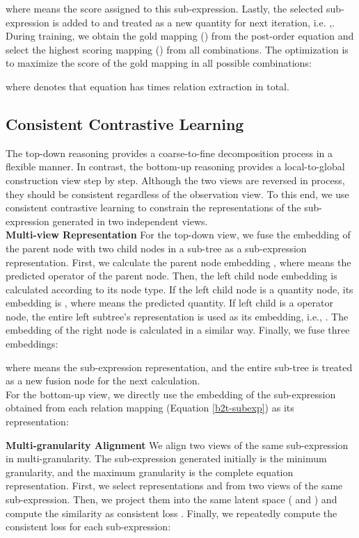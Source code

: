 \documentclass[11pt]{article}
\begin{document}
where  means the score assigned to this sub-expression. Lastly, the selected sub-expression is added to  and treated as a new quantity for next iteration, i.e. ,.\\
\indent During training, we obtain the gold mapping () from the post-order equation  and select the highest scoring mapping () from all combinations. The optimization is to maximize the score of the gold mapping in all possible combinations:

where  denotes that equation  has  times relation extraction in total.
\subsection{Consistent Contrastive Learning} \label{CCL}
The top-down reasoning provides a coarse-to-fine decomposition process in a flexible manner. In contrast, the bottom-up reasoning provides a local-to-global construction view step by step. Although the two views are reversed in process, they should be consistent regardless of the observation view. To this end, we use consistent contrastive learning to constrain the representations of the sub-expression generated in two independent views.\\ 
\indent \textbf{Multi-view Representation} For the top-down view, we fuse the embedding of the parent node with two child nodes in a sub-tree as a sub-expression representation. First, we calculate the parent node embedding , where  means the predicted operator of the parent node. Then, the left child node embedding  is calculated according to its node type. If the left child node is a quantity node, its embedding is , where  means the predicted quantity. If left child is a operator node, the entire left subtree's representation is used as its embedding, i.e., . The embedding of the right node  is calculated in a similar way. Finally, we fuse three embeddings:

where  means the sub-expression representation, and the entire sub-tree is treated as a new fusion node for the next calculation.\\
\indent For the bottom-up view, we directly use the embedding of the sub-expression obtained from each relation mapping (Equation \ref{b2t-subexp}) as its representation:

\indent \textbf{Multi-granularity Alignment} We align two views of the same sub-expression in multi-granularity. The sub-expression generated initially is the minimum granularity, and the maximum granularity is the complete equation representation. First, we select representations  and  from two views of the same sub-expression. Then, we project them into the same latent space ( and ) and compute the similarity as consistent loss . Finally, we repeatedly compute the consistent loss for each sub-expression:
\end{document}
